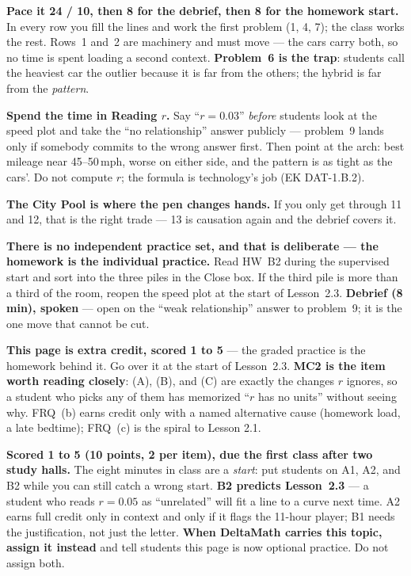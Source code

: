 \documentclass[10pt]{article}
\begin{document}
\begin{teachernote}
\textbf{Pace it 24 / 10, then 8 for the debrief, then 8 for the homework start.} In every row
you fill the lines and work the first problem (1, 4, 7); the class works the rest. Rows~1 and~2
are machinery and must move --- the cars carry both, so no time is spent loading a second
context. \textbf{Problem~6 is the trap}: students call the heaviest car the outlier because it
is far from the others; the hybrid is far from the \emph{pattern}.

\textbf{Spend the time in Reading $r$.} Say ``$r = 0.03$'' \emph{before} students look at the
speed plot and take the ``no relationship'' answer publicly --- problem~9 lands only if somebody
commits to the wrong answer first. Then point at the arch: best mileage near 45--50\,mph,
worse on either side, and the pattern is as tight as the cars'. Do not compute $r$; the formula
is technology's job (EK DAT-1.B.2).

\textbf{The City Pool is where the pen changes hands.} If you only get through 11 and 12, that
is the right trade --- 13 is causation again and the debrief covers it.

\textbf{There is no independent practice set, and that is deliberate --- the homework is the
individual practice.} Read HW~B2 during the supervised start and sort into the three piles in
the Close box. If the third pile is more than a third of the room, reopen the speed plot at the
start of Lesson~2.3. \textbf{Debrief (8 min), spoken} --- open on the ``weak relationship''
answer to problem~9; it is the one move that cannot be cut.
\end{teachernote}

\begin{teachernote}[AP Practice]
\textbf{This page is extra credit, scored 1 to 5} --- the graded practice is the homework behind
it. Go over it at the start of Lesson~2.3. \textbf{MC2 is the item worth reading closely}: (A),
(B), and (C) are exactly the changes $r$ ignores, so a student who picks any of them has
memorized ``$r$ has no units'' without seeing why. FRQ~(b) earns credit only with a named
alternative cause (homework load, a late bedtime); FRQ~(c) is the spiral to Lesson 2.1.
\end{teachernote}

\begin{teachernote}[Homework]
\textbf{Scored 1 to 5 (10 points, 2 per item), due the first class after two study halls.} The eight
minutes in class are a \emph{start}: put students on A1, A2, and B2 while you can still catch a
wrong start. \textbf{B2 predicts Lesson~2.3} --- a student who reads $r = 0.05$ as ``unrelated''
will fit a line to a curve next time. A2 earns full credit only in context and only if it
flags the 11-hour player; B1 needs the justification, not just the letter.
\textbf{When DeltaMath carries this topic, assign it instead} and tell students this page is now optional practice. Do not assign both.
\end{teachernote}
\end{document}
